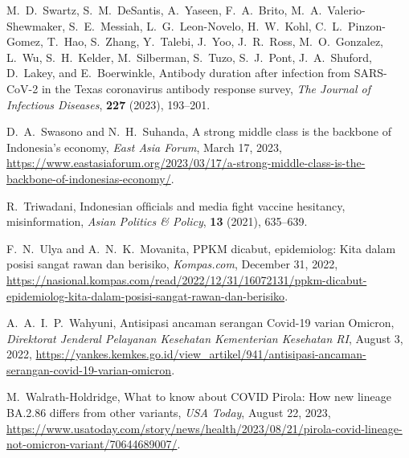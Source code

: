 \documentclass[11pt,reqno]{amsart}
\begin{document}
\begin{thebibliography}{99}
      M.\ D.\ Swartz, S.\ M.\ DeSantis, A.\ Yaseen, F.\ A.\ Brito, M.\ A.\ Valerio-Shewmaker, S.\ E.\ Messiah, L.\ G.\ Leon-Novelo, H.\ W.\ Kohl, C.\ L.\ Pinzon-Gomez, T.\ Hao, S.\ Zhang, Y.\ Talebi, J.\ Yoo, J.\ R.\ Ross, M.\ O.\ Gonzalez, L.\ Wu, S.\ H.\ Kelder, M.\ Silberman, S.\ Tuzo, S.\ J.\ Pont, J.\ A.\ Shuford, D.\ Lakey, and E.\ Boerwinkle,
     \newblock Antibody duration after infection from SARS-CoV-2 in the Texas coronavirus antibody response survey,
     \newblock \emph{The Journal of Infectious Diseases}, \textbf{227} (2023), 193--201.

     D.\ A.\ Swasono and N.\ H.\ Suhanda,
     \newblock A strong middle class is the backbone of Indonesia's economy,
     \newblock \emph{East Asia Forum}, March 17, 2023, \ul{https://www.eastasiaforum.org/2023/03/17/a-strong-middle-class-is-the-backbone-of-indonesias-economy/}.

     R.\ Triwadani,
     \newblock Indonesian ofﬁcials and media ﬁght vaccine hesitancy, misinformation,
     \newblock \emph{Asian Politics \& Policy}, \textbf{13} (2021), 635--639.

     F.\ N.\ Ulya and A.\ N.\ K.\ Movanita,
     \newblock PPKM dicabut, epidemiolog: Kita dalam posisi sangat rawan dan berisiko,
     \newblock \emph{Kompas.com}, December 31, 2022, \ul{https://nasional.kompas.com/read/2022/12/31/16072131/ppkm-dicabut-epidemiolog-kita-dalam-posisi-\linebreak sangat-rawan-dan-berisiko}.



     A.\ A.\ I.\ P.\ Wahyuni,
     \newblock Antisipasi ancaman serangan Covid-19 varian Omicron,
     \newblock \emph{Direktorat Jenderal Pelayanan Kesehatan Kementerian Kesehatan RI}, August 3, 2022, \ul{https://yankes.kemkes.go.id/view\_artikel/941/antisipasi-ancaman-serangan-covid-19-varian-omicron}.

     M.\ Walrath-Holdridge,
     \newblock What to know about COVID Pirola: How new lineage BA.2.86 differs from other variants,
     \newblock \emph{USA Today}, August 22, 2023, \ul{https://www.usatoday.com/story/news/health/2023/08/21/pirola-covid-lineage-not-omicron-variant/70644689007/}.


\end{thebibliography}
\end{document}
